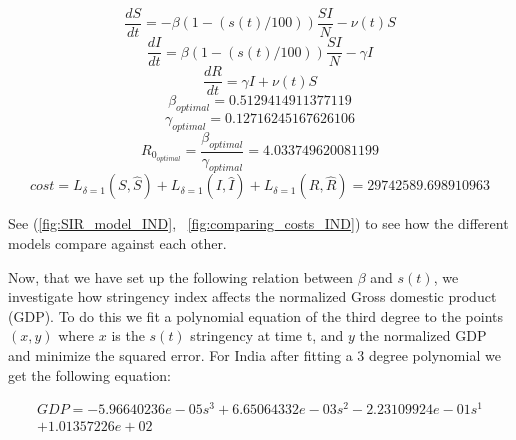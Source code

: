 \documentclass[tikz,fleqn,12pt]{wlscirep}
\begin{document}
\begin{equation}
  \frac{dS}{dt} = -\beta  (1 - (s(t)/100))  \frac{S I}{N} - \nu(t) S
  \label{eq:S_with_lockdown_and_time_varying_nu}
\end{equation}
\begin{equation}
  \frac{dI}{dt} = \beta  (1 - (s(t)/100)) \frac{S I}{N} - \gamma I
  \label{eq:I_with_lockdown_and_time_varying_nu}
\end{equation}
\begin{equation}
  \frac{dR}{dt} = \gamma I + \nu(t) S
  \label{eq:R_with_lockdown_and_time_varying_nu}
\end{equation}
\begin{equation}
  \beta_{optimal} = 0.5129414911377119
  \label{eq:beta_optimal_with_lockdown_and_time_varying_nu}
\end{equation}
\begin{equation}
  \gamma_{optimal} = 0.12716245167626106
  \label{eq:gamma_optimal_with_lockdown_and_time_varying_nu}
\end{equation}
\begin{equation}
  R_{0_{optimal}} = \frac{\beta_{optimal}}{\gamma_{optimal}} = 4.033749620081199
  \label{eq:r0_with_lockdown_and_time_varying_nu}
\end{equation}
\begin{equation}
  cost = L_{\delta = 1}(S, \hat{S}) + L_{\delta = 1}(I, \hat{I}) + L_{\delta = 1}(R, \hat{R}) = 29742589.698910963
  \label{eq:cost_with_lockdown_and_time_varying_nu}
\end{equation}

See (\ref{fig:SIR_model_IND}, ~\ref{fig:comparing_costs_IND}) to see how the different models compare against each other.

Now, that we have set up the following relation between $\beta$ and $s(t)$, we investigate how stringency index affects the normalized Gross domestic product (GDP). To do this we fit a polynomial equation of the third degree to the points $(x, y)$ where $x$ is the $s(t)$ stringency at time t, and $y$ the normalized GDP and minimize the squared error. For India after fitting a 3 degree polynomial we get the following equation:

\begin{equation}
    \begin{split}
      GDP = -5.96640236e-05 s^{3} + 6.65064332e-03 s^{2} -2.23109924e-01 s^{1} \\
    + 1.01357226e+02
    \end{split}
    \label{eq:gdp_modelled_with_stringency_IND}
\end{equation}
\end{document}
